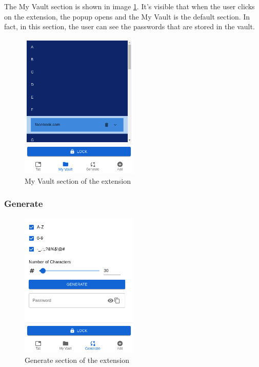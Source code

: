 The My Vault section is shown in image \ref{fig:my-vault}. It's visible that when the user clicks on the extension, the popup opens and the My Vault is the default section. In fact, in this section, the user can see the passwords that are stored in the vault.
\begin{figure}[h!]
    \centering
    \vspace{0.5cm}
    \includegraphics[width=0.5\textwidth]{images/my-vault.png}
    \caption{My Vault section of the extension}
    \label{fig:my-vault} %
\end{figure}

\subsubsection{Generate}

\begin{figure}[h!]
    \centering
    \vspace{0.5cm}
    \includegraphics[width=0.5\textwidth]{images/generate.png}
    \caption{Generate section of the extension}
    \label{fig:generate} %
\end{figure}

